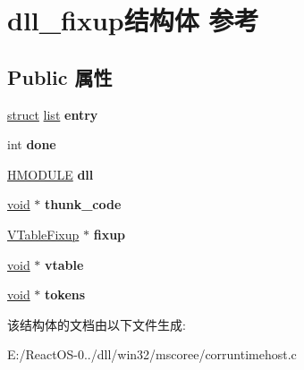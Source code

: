 \hypertarget{structdll__fixup}{}\section{dll\+\_\+fixup结构体 参考}
\label{structdll__fixup}
\subsection*{Public 属性}
\begin{DoxyCompactItemize}
\item 
\mbox{\label{structdll__fixup_abe8bda693c86dbcf52b40f2bec4d4e4d}} 
\hyperlink{interfacestruct}{struct} \hyperlink{classlist}{list} {\bfseries entry}
\item 
\mbox{\label{structdll__fixup_ac46a632d08aa12beee8a5d139196114b}} 
int {\bfseries done}
\item 
\mbox{\label{structdll__fixup_ade1ea806892efae2ad3201de27abfcb0}} 
\hyperlink{interfacevoid}{H\+M\+O\+D\+U\+LE} {\bfseries dll}
\item 
\mbox{\label{structdll__fixup_a32e522386063c84ffffa6437e4e3e0ff}} 
\hyperlink{interfacevoid}{void} $\ast$ {\bfseries thunk\+\_\+code}
\item 
\mbox{\label{structdll__fixup_a57ae9cc5e8905a3ba25a21da0a7e6211}} 
\hyperlink{struct___v_table_fixup}{V\+Table\+Fixup} $\ast$ {\bfseries fixup}
\item 
\mbox{\label{structdll__fixup_a5e621e9d27a139dbda8f5c34b1fdd221}} 
\hyperlink{interfacevoid}{void} $\ast$ {\bfseries vtable}
\item 
\mbox{\label{structdll__fixup_a951781dea1f1ed8054761280451585ae}} 
\hyperlink{interfacevoid}{void} $\ast$ {\bfseries tokens}
\end{DoxyCompactItemize}


该结构体的文档由以下文件生成\+:\begin{DoxyCompactItemize}
\item 
E\+:/\+React\+O\+S-\/0../dll/win32/mscoree/corruntimehost.\+c\end{DoxyCompactItemize}
